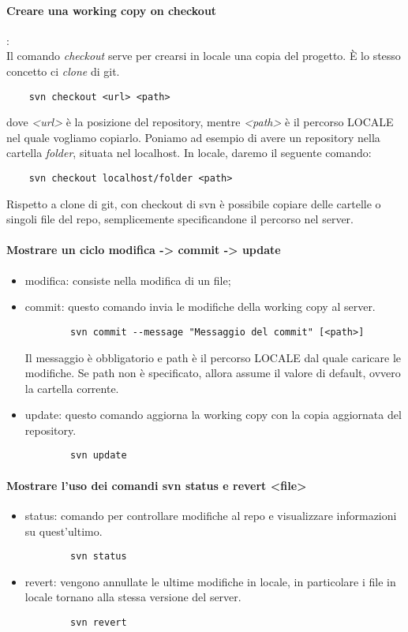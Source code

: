 \documentclass[a4paper]{article}
\begin{document}
	\paragraph{Creare una working copy on checkout}:\\
	Il comando \textit{checkout} serve per crearsi in locale una copia del progetto. È lo stesso concetto ci \textit{clone} di git.
	\begin{verbatim}
	svn checkout <url> <path>
	\end{verbatim}
	dove \textit{<url>} è la posizione del repository, mentre \textit{<path>} è il percorso LOCALE nel quale vogliamo copiarlo.
	Poniamo ad esempio di avere un repository nella cartella \textit{folder}, situata nel localhost.
	In locale, daremo il seguente comando:
	\begin{verbatim}
	svn checkout localhost/folder <path>
	\end{verbatim}
	Rispetto a clone di git, con checkout di svn è possibile copiare delle cartelle o singoli file del repo, semplicemente specificandone il percorso nel server.
	
	\paragraph{Mostrare un ciclo modifica -> commit -> update}
	\begin{itemize}
		\item modifica: consiste nella modifica di un file;
		\item commit: questo comando invia le modifiche della working copy al server.\begin{verbatim}
		svn commit --message "Messaggio del commit" [<path>]
		\end{verbatim}
		Il messaggio è obbligatorio e path è il percorso LOCALE dal quale caricare le modifiche. Se path non è specificato, allora assume il valore di default, ovvero la cartella corrente.
		\item update: questo comando aggiorna la working copy con la copia aggiornata del repository.
		\begin{verbatim}
		svn update
		\end{verbatim}
	\end{itemize}
	
	\paragraph{Mostrare l'uso dei comandi svn status e revert <file>}
	\begin{itemize}
		\item status: comando per controllare modifiche al repo e visualizzare informazioni su quest'ultimo.
		\begin{verbatim}
		svn status
		\end{verbatim}
		\item revert: vengono annullate le ultime modifiche in locale, in particolare i file in locale tornano alla stessa versione del server.
		\begin{verbatim}
		svn revert
		\end{verbatim}
	\end{itemize}
\end{document}
